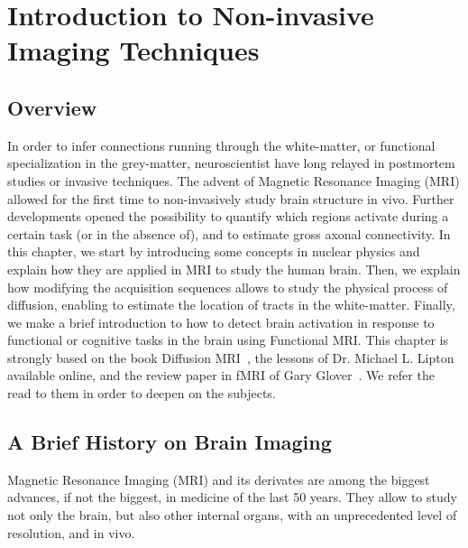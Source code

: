 \chapter{Introduction to Non-invasive Imaging Techniques}
\label{ch:intro_mri}

\section{Overview}
In order to infer connections running through the white-matter, or functional
specialization in the grey-matter, neuroscientist have long relayed in postmortem
studies or invasive techniques. The advent of Magnetic Resonance Imaging (MRI)
allowed for the first time to non-invasively study brain structure in vivo.
Further developments opened the possibility to quantify which regions
activate during a certain task (or in the absence of), and to estimate gross
axonal connectivity. In this chapter, we start by introducing some concepts in
nuclear physics and explain how they are applied in MRI to study the human
brain. Then, we explain how modifying the acquisition sequences allows to
study the physical process of diffusion, enabling to estimate the location
of tracts in the white-matter. Finally, we make a brief introduction to how to
detect brain activation in response to functional or cognitive tasks in the
brain using Functional MRI. This chapter is strongly based on the book
Diffusion MRI~\cite{Basser2009}, the lessons of Dr. Michael L. 
Lipton~\cite{Lipton2014} available online, and the review paper in fMRI of 
Gary Glover~\cite{Glover2011}. We refer the read to them in order to deepen on
the subjects.

\section{A Brief History on Brain Imaging}

Magnetic Resonance Imaging (MRI) and its derivates are among the biggest advances,
if not the biggest, in medicine of the last 50 years. They allow to study not
only the brain, but also other internal organs, with an unprecedented level of
resolution, and in vivo. 

